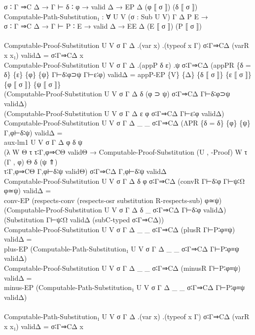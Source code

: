 {\begin{code}
{\>  σ ∶ Γ ⇒C Δ → Γ ⊢ δ ∶ φ → valid Δ → EP Δ (φ ⟦ σ ⟧) (δ ⟦ σ ⟧)\<\\
\>Computable-Path-Substitution₁ : ∀ U V (σ : Sub U V) Γ Δ P E →\<\\
\>  σ ∶ Γ ⇒C Δ → Γ ⊢ P ∶ E → valid Δ → EE Δ (E ⟦ σ ⟧) (P ⟦ σ ⟧)\<\\
\>\<\\
\>Computable-Proof-Substitution U V σ Γ Δ .(var x) .(typeof x Γ) σ∶Γ⇒CΔ (varR x x₁) validΔ = σ∶Γ⇒CΔ x\<\\
\>Computable-Proof-Substitution U V σ Γ Δ .(appP δ ε) .ψ σ∶Γ⇒CΔ (appPR \{δ = δ\} \{ε\} \{φ\} \{ψ\} Γ⊢δ∶φ⊃ψ Γ⊢ε∶φ) validΔ = appP-EP \{V\} \{Δ\} \{δ ⟦ σ ⟧\} \{ε ⟦ σ ⟧\} \{φ ⟦ σ ⟧\} \{ψ ⟦ σ ⟧\}\<\\
\>  (Computable-Proof-Substitution U V σ Γ Δ δ (φ ⊃ ψ) σ∶Γ⇒CΔ Γ⊢δ∶φ⊃ψ validΔ) \<\\
\>  (Computable-Proof-Substitution U V σ Γ Δ ε φ σ∶Γ⇒CΔ Γ⊢ε∶φ validΔ)\<\\
\>Computable-Proof-Substitution U V σ Γ Δ \_ \_ σ∶Γ⇒CΔ (ΛPR \{δ = δ\} \{φ\} \{ψ\} Γ,φ⊢δ∶ψ) validΔ = \<\\
\>  aux-lm1 U V σ Γ Δ φ δ ψ \<\\
\>    (λ W Θ τ τ∶Γ,φ⇒CΘ validΘ → Computable-Proof-Substitution (U , -Proof) W τ (Γ , φ) Θ δ (ψ ⇑)\<\\
\>                          τ∶Γ,φ⇒CΘ Γ,φ⊢δ∶ψ validΘ) σ∶Γ⇒CΔ Γ,φ⊢δ∶ψ validΔ\<\\
\>Computable-Proof-Substitution U V σ Γ Δ δ φ σ∶Γ⇒CΔ (convR Γ⊢δ∶φ Γ⊢ψ∶Ω φ≃ψ) validΔ = \<\\
\>  conv-EP (respects-conv (respects-osr substitution R-respects-sub) φ≃ψ) \<\\
\>  (Computable-Proof-Substitution U V σ Γ Δ δ \_ σ∶Γ⇒CΔ Γ⊢δ∶φ validΔ)\<\\
\>  (Substitution Γ⊢ψ∶Ω validΔ (subC-typed σ∶Γ⇒CΔ))\<\\
\>Computable-Proof-Substitution U V σ Γ Δ \_ \_ σ∶Γ⇒CΔ (plusR Γ⊢P∶φ≡ψ) validΔ = \<\\
\>  plus-EP (Computable-Path-Substitution₁ U V σ Γ Δ \_ \_ σ∶Γ⇒CΔ Γ⊢P∶φ≡ψ validΔ)\<\\
\>Computable-Proof-Substitution U V σ Γ Δ \_ \_ σ∶Γ⇒CΔ (minusR Γ⊢P∶φ≡ψ) validΔ = \<\\
\>  minus-EP (Computable-Path-Substitution₁ U V σ Γ Δ \_ \_ σ∶Γ⇒CΔ Γ⊢P∶φ≡ψ validΔ)\<\\
\>\<\\
\>Computable-Path-Substitution₁ U V σ Γ Δ .(var x) .(typeof x Γ) σ∶Γ⇒CΔ (varR x x₁) validΔ = σ∶Γ⇒CΔ x\<\\
}
\end{code}}
